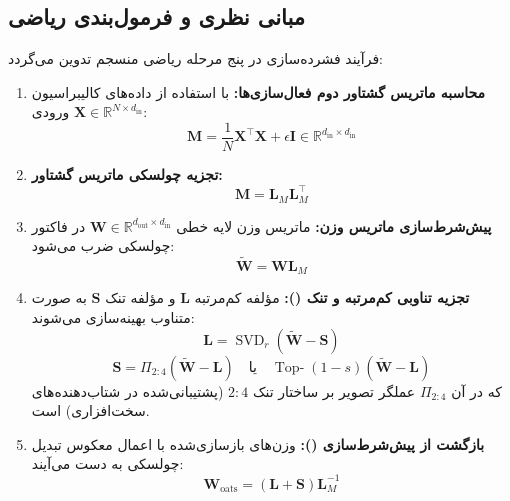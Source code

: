 \subsection{مبانی نظری و فرمول‌بندی ریاضی}
فرآیند فشرده‌سازی  در پنج مرحله ریاضی منسجم تدوین می‌گردد:
\begin{enumerate}
    \item \textbf{محاسبه ماتریس گشتاور دوم فعال‌سازی‌ها:} با استفاده از داده‌های کالیبراسیون ورودی $\mathbf{X} \in \mathbb{R}^{N \times d_{\text{in}}}$:
    \begin{equation}
    \mathbf{M} = \frac{1}{N} \mathbf{X}^\top \mathbf{X} + \epsilon \mathbf{I} \in \mathbb{R}^{d_{\text{in}} \times d_{\text{in}}}
    \end{equation}
    \item \textbf{تجزیه چولسکی ماتریس گشتاور:}
    \begin{equation}
    \mathbf{M} = \mathbf{L}_M \mathbf{L}_M^\top
    \end{equation}
    \item \textbf{پیش‌شرط‌سازی ماتریس وزن:} ماتریس وزن لایه خطی $\mathbf{W} \in \mathbb{R}^{d_{\text{out}} \times d_{\text{in}}}$ در فاکتور چولسکی ضرب می‌شود:
    \begin{equation}
    \tilde{\mathbf{W}} = \mathbf{W} \mathbf{L}_M
    \end{equation}
    \item \textbf{تجزیه تناوبی کم‌مرتبه و تنک ():} مؤلفه کم‌مرتبه $\mathbf{L}$ و مؤلفه تنک $\mathbf{S}$ به صورت متناوب بهینه‌سازی می‌شوند:
    \begin{equation}
    \mathbf{L} = \operatorname{SVD}_r(\tilde{\mathbf{W}} - \mathbf{S})
    \end{equation}
    \begin{equation}
    \mathbf{S} = \Pi_{2:4}(\tilde{\mathbf{W}} - \mathbf{L}) \quad \text{یا} \quad \operatorname{Top-}(1-s)(\tilde{\mathbf{W}} - \mathbf{L})
    \end{equation}
    که در آن $\Pi_{2:4}$ عملگر تصویر بر ساختار تنک $2:4$ (پشتیبانی‌شده در شتاب‌دهنده‌های سخت‌افزاری) است.
    \item \textbf{بازگشت از پیش‌شرط‌سازی ():} وزن‌های بازسازی‌شده با اعمال معکوس تبدیل چولسکی به دست می‌آیند:
    \begin{equation}
    \mathbf{W}_{\text{oats}} = (\mathbf{L} + \mathbf{S}) \mathbf{L}_M^{-1}
    \end{equation}
\end{enumerate}

